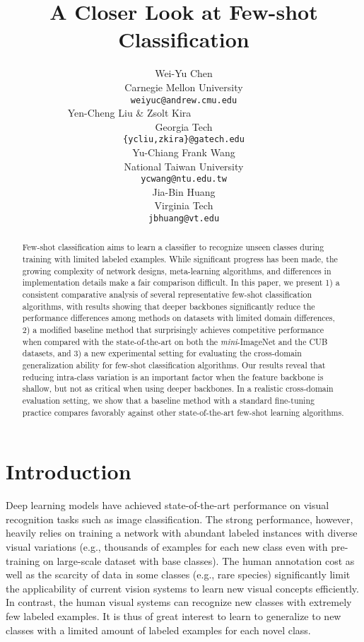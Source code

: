 \documentclass{article}
\title{A Closer Look at Few-shot Classification}
\author{Wei-Yu Chen \\
Carnegie Mellon University\\
\texttt{weiyuc@andrew.cmu.edu} \\
\And
Yen-Cheng Liu \& Zsolt Kira~~~~~~~~~~~~~~~~~~~~~~\\
Georgia Tech \\
\texttt{\{ycliu,zkira\}@gatech.edu} \\
\AND
Yu-Chiang Frank Wang \\
National Taiwan University\\
\texttt{ycwang@ntu.edu.tw} \\
\And
Jia-Bin Huang \\
Virginia Tech \\
\texttt{jbhuang@vt.edu} \\
}
\def \miniI {\emph{mini}-ImageNet }
\begin{document}
\maketitle




\begin{abstract}
Few-shot classification aims to learn a classifier to recognize unseen classes during training with limited labeled examples.
While significant progress has been made, the growing complexity of network designs, meta-learning algorithms, and differences in implementation details make a fair comparison difficult.
In this paper, we present 
1) a consistent comparative analysis of several representative few-shot classification algorithms, with results showing that deeper backbones significantly reduce the performance differences among methods on datasets with limited domain differences,
2) a modified baseline method that surprisingly achieves competitive performance when compared with the state-of-the-art on both the \miniI and the CUB datasets, and
3) a new experimental setting for evaluating the cross-domain generalization ability for few-shot classification algorithms.
Our results reveal that reducing intra-class variation is an important factor when the feature backbone is shallow, but not as critical when using deeper backbones.
In a realistic cross-domain evaluation setting, we show that a baseline method with a standard fine-tuning practice compares favorably against other state-of-the-art few-shot learning algorithms. 
\end{abstract}



 
\section{Introduction}
\label{sec:intro}


Deep learning models have achieved state-of-the-art performance on visual recognition tasks such as image classification. The strong performance, however, heavily relies on training a network with abundant labeled instances with diverse visual variations (e.g., thousands of examples for each new class even with pre-training on large-scale dataset with base classes). The human annotation cost as well as the scarcity of data in some classes (e.g., rare species) significantly limit the applicability of current vision systems to learn new visual concepts efficiently. In contrast, the human visual systems can recognize new classes with extremely few labeled examples. It is thus of great interest to learn to generalize to new classes with a limited amount of labeled examples for each novel class.
\end{document}
